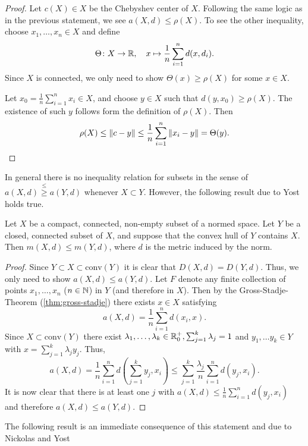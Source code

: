 \begin{proof}
	Let $c(X)\in X$ be the Chebyshev center of $X$. Following the same logic as in the previous statement, we see $a(X,d)\leq\rho(X)$. To see the other inequality, choose $x_1,\dots,x_n\in X$ and define
	\[
	\Theta\colon X\to \mathbb{R},\quad x\mapsto \frac{1}{n}\sum_{i=1}^nd(x,d_i).
	\]
	Since $X$ is connected, we only need to show $\Theta(x)\geq \rho(X)$ for some $x\in X$.
	
	Let $x_0=\frac{1}{n}\sum_{i=1}^{n}x_i\in X$, and choose $y\in X$ such that $d(y,x_0)\geq \rho(X)$. The existence of such $y$ follows form the definition of $\rho(X)$. Then
	\[
	\rho(X)\leq \|c-y\|\leq\frac{1}{n}\sum_{i=1}^{n}\|x_i-y\|=\Theta(y).\qedhere
	\]
\end{proof}

In general there is no inequality relation for subsets in the sense of $a(X,d)\stackrel{\leq}{\geq}a(Y,d)$ whenever $X\subset Y$. However, the following result due to Yost \cite{yost} holds true.

\begin{theorem}
	Let $X$ be a compact, connected, non-empty subset of a normed space. Let $Y$ be a closed, connected subset of $X$, and suppose that the convex hull of $Y$ contains $X$. Then $m(X,d)\leq m(Y,d)$, where $d$ is the metric induced by the norm.
\end{theorem}

\begin{proof}
	Since $Y\subset X\subset \mathrm{conv}(Y)$ it is clear that $D(X,d)=D(Y,d)$. Thus, we only need to show $a(X,d)\leq a(Y,d)$. Let $F$ denote any finite collection of points $x_1,\dots,x_n$ ($n\in \mathbb{N}$) in $Y$ (and therefore in $X$). Then by the Gross-Stadje-Theorem (\autoref{thm:gross-stadje}) there exists $x\in X$ satisfying
	\[
	a(X,d)=\frac{1}{n}\sum_{i=1}^{n}d(x_i,x).
	\]
	Since $X\subset \mathrm{conv}(Y)$ there exist $\lambda_1,\dots,\lambda_k\in \mathbb{R}_0^+, \sum_{j=1}^{k}\lambda_j=1$  and $y_1,\dots y_k\in Y$ with $x=\sum_{j=1}^{k}\lambda_j y_j$.
	Thus,
	\[
	a(X,d)=\frac{1}{n}\sum_{i=1}^n d\left(\sum_{j=1}^k y_j,x_i\right)\leq\sum_{j=1}^k\frac{\lambda_j}{n}\sum_{i=1}^n d(y_j,x_i).
	\]
	It is now clear %
	 that there is at least one $j$ with $a(X,d)\leq \frac{1}{n}\sum_{i=1}^n d(y_j,x_i)$ and therefore $a(X,d)\leq a(Y,d)$.
\end{proof}

The following result is an immediate consequence of this statement and due to Nickolas and Yost \cite{nickolas-yost:euclidean}

